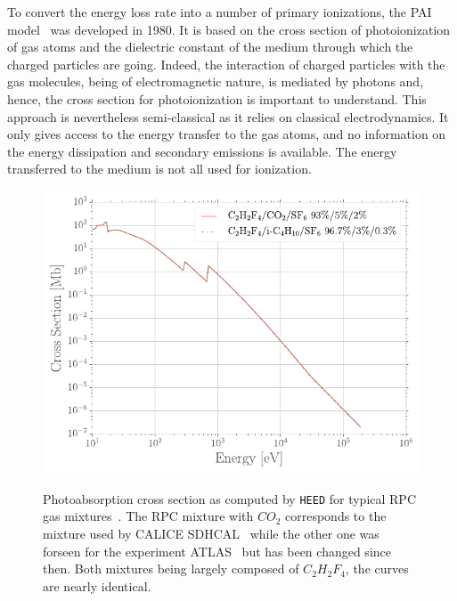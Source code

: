 	To convert the energy loss rate into a number of primary ionizations, the \acf{PAI} model~\cite{ALLISON1980} was developed in 1980. It is based on the cross section of photoionization of gas atoms and the dielectric constant of the medium through which the charged particles are going. Indeed, the interaction of charged particles with the gas molecules, being of electromagnetic nature, is mediated by photons and, hence, the cross section for photoionization is important to understand. This approach is nevertheless semi-classical as it relies on classical electrodynamics. It only gives access to the energy transfer to the gas atoms, and no information on the energy dissipation and secondary emissions is available. The energy transferred to the medium is not all used for ionization.
	
\begingroup\setlength{\intextsep}{0pt}\setlength{\columnsep}{15pt}
	
	\begin{figure}
		\centering
		\includegraphics[width = \linewidth]{fig/chapt3/HEED-RPC.pdf}\\
		\caption{\label{fig:PAIR-RPC} Photoabsorption cross section as computed by \texttt{HEED} for typical RPC gas mixtures~\cite{VINCENT2017}. The RPC mixture with $CO_2$ corresponds to the mixture used by CALICE SDHCAL~\cite{ARNAUD2015} while the other one was forseen for the experiment ATLAS~\cite{RIEGLER2003} but has been changed since then. Both mixtures being largely composed of $C_2H_2F_4$, the curves are nearly identical.}
	\end{figure}
	
